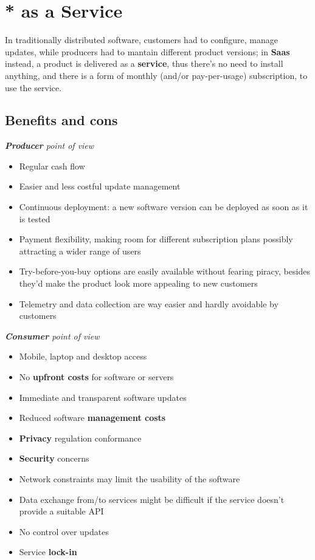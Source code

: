 \chapter{* as a Service}

In traditionally distributed software,
customers had to configure, manage updates, while producers had to mantain different product versions; 
in \textbf{Saas} instead,
a product is delivered as a \textbf{service}, thus there's no need to install anything,
and there is a form of monthly (and/or pay-per-usage) subscription, to use the service.

\section{Benefits and cons}
\textit{\textbf{Producer} point of view}
\begin{itemize}
   \color{darkgreen}
   \item Regular cash flow
   \item Easier and less costful update management
   \item Continuous deployment: a new software version can be deployed as soon as it is tested
   \item Payment flexibility, making room for different subscription plans possibly attracting a wider range of users
   \item Try-before-you-buy options are easily available without fearing piracy, besides they'd make the product look more appealing to new customers
   \item Telemetry and data collection are way easier and hardly avoidable by customers   
\end{itemize}

\textit{\textbf{Consumer} point of view}
\begin{itemize}
   \color{darkgreen}
   \item Mobile, laptop and desktop access
   \item No \textbf{upfront costs} for software or servers
   \item Immediate and transparent software updates
   \item Reduced software \textbf{management costs}
\end{itemize}
\begin{itemize}
   \color{darkred}
   \item \textbf{Privacy} regulation conformance
   \item \textbf{Security} concerns
   \item Network constraints may limit the usability of the software
   \item Data exchange from/to services might be difficult if the service doesn't provide a suitable API
   \item No control over updates
   \item Service \textbf{lock-in}
\end{itemize}

